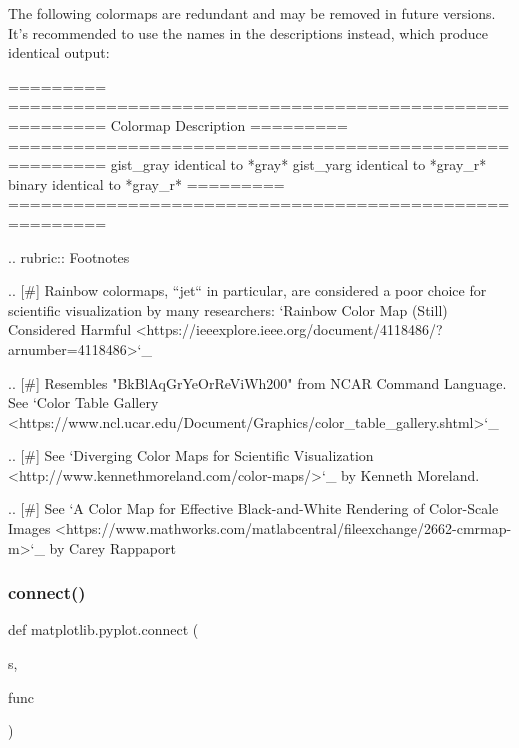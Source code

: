 \begin{DoxyVerb}
The following colormaps are redundant and may be removed in future
versions.  It's recommended to use the names in the descriptions
instead, which produce identical output:

  =========  =======================================================
  Colormap   Description
  =========  =======================================================
  gist_gray  identical to *gray*
  gist_yarg  identical to *gray_r*
  binary     identical to *gray_r*
  =========  =======================================================

.. rubric:: Footnotes

.. [#] Rainbow colormaps, ``jet`` in particular, are considered a poor
  choice for scientific visualization by many researchers: `Rainbow Color
  Map (Still) Considered Harmful
  <https://ieeexplore.ieee.org/document/4118486/?arnumber=4118486>`_

.. [#] Resembles "BkBlAqGrYeOrReViWh200" from NCAR Command
  Language. See `Color Table Gallery
  <https://www.ncl.ucar.edu/Document/Graphics/color_table_gallery.shtml>`_

.. [#] See `Diverging Color Maps for Scientific Visualization
  <http://www.kennethmoreland.com/color-maps/>`_ by Kenneth Moreland.

.. [#] See `A Color Map for Effective Black-and-White Rendering of
  Color-Scale Images
  <https://www.mathworks.com/matlabcentral/fileexchange/2662-cmrmap-m>`_
  by Carey Rappaport
\end{DoxyVerb}
 \mbox{\label{namespacematplotlib_1_1pyplot_a67d896e6dcaa15337699458beba54d11}} 
\subsubsection{\texorpdfstring{connect()}{connect()}}
{\footnotesize\ttfamily def matplotlib.\+pyplot.\+connect (\begin{DoxyParamCaption}\item[{}]{s,  }\item[{}]{func }\end{DoxyParamCaption})}

\mbox{\label{namespacematplotlib_1_1pyplot_aad03a91ca4a47b4c9748f1fcd6fed428}} 
